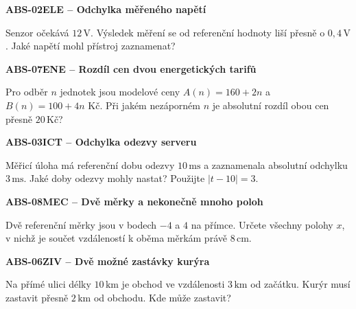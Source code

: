 \documentclass[11pt,a4paper]{article}
\begin{document}
\vspace{4mm}\par\noindent\dotfill\par\medskip
\par\medskip\noindent\textbf{ABS-02}\quad\textbf{ELE -- Odchylka měřeného napětí}\par
Senzor očekává $12\,\mathrm V$. Výsledek měření se od referenční hodnoty liší přesně o $0{,}4\,\mathrm V$. Jaké napětí mohl přístroj zaznamenat?

\vspace{4mm}\par\noindent\dotfill\par\medskip
\par\medskip\noindent\textbf{ABS-07}\quad\textbf{ENE -- Rozdíl cen dvou energetických tarifů}\par
Pro odběr $n$ jednotek jsou modelové ceny $A(n)=160+2n$ a $B(n)=100+4n$ Kč. Při jakém nezáporném $n$ je absolutní rozdíl obou cen přesně $20\,\text{Kč}$?

\vspace{4mm}\par\noindent\dotfill\par\medskip
\par\medskip\noindent\textbf{ABS-03}\quad\textbf{ICT -- Odchylka odezvy serveru}\par
Měřicí úloha má referenční dobu odezvy $10\,\mathrm{ms}$ a zaznamenala absolutní odchylku $3\,\mathrm{ms}$. Jaké doby odezvy mohly nastat? Použijte $|t-10|=3$.

\vspace{4mm}\par\noindent\dotfill\par\medskip
\par\medskip\noindent\textbf{ABS-08}\quad\textbf{MEC -- Dvě měrky a nekonečně mnoho poloh}\par
Dvě referenční měrky jsou v bodech $-4$ a $4$ na přímce. Určete všechny polohy $x$, v nichž je součet vzdáleností k oběma měrkám právě $8\,\mathrm{cm}$.

\vspace{4mm}\par\noindent\dotfill\par\medskip
\par\medskip\noindent\textbf{ABS-06}\quad\textbf{ZIV -- Dvě možné zastávky kurýra}\par
Na přímé ulici délky $10\,\mathrm{km}$ je obchod ve vzdálenosti $3\,\mathrm{km}$ od začátku. Kurýr musí zastavit přesně $2\,\mathrm{km}$ od obchodu. Kde může zastavit?
\end{document}
